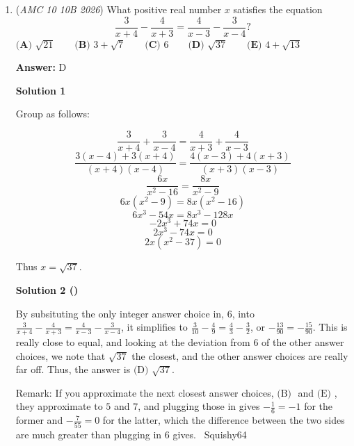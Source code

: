 \begin{enumerate}
 \textbf{Step 14: Steiner-formula consistency check.} For a box with side lengths $a,b,c$, the outer parallel body at distance $t$ has volume given by the Steiner polynomial
 \[abc+2(ab+bc+ca)\,t+\pi(a+b+c)\,t^2+\frac43\pi t^3.\]The $t^3$ term is contributed by the eight vertex regions, which assemble into one full ball. At $t=\frac12$ it equals $\frac43\pi\cdot\frac18=\frac\pi6$, agreeing with Step 13.

 \textbf{Step 15: Conclusion.} Combining Steps 1, 9, and 13,
 \[\lambda(U)=6-\frac{\pi}{6}\implies\boxed{\textbf{(C)}\ 6-\frac{\pi}{6}}.\]

 Remark: Who actually did this on the test? ~Squishy64

 


	\item (\textit{AMC 10 10B 2026}) What positive real number $x$ satisfies the equation 
 \[\frac{3}{x+4}-\frac{4}{x+3}=\frac{4}{x-3}-\frac{3}{x-4}?\]
$\textbf{(A) } \sqrt{21} \qquad \textbf{(B) } 3+\sqrt{7} \qquad \textbf{(C) } 6 \qquad \textbf{(D) } \sqrt{37} \qquad \textbf{(E) } 4+\sqrt{13}$

 \textbf{Answer: }D



\textbf{Solution 1}

Group as follows:

 
 \[\frac{3}{x+4} + \frac{3}{x-4} = \frac{4}{x+3} + \frac{4}{x-3}\]
 \[\frac{3(x-4) + 3(x+4)}{(x+4)(x-4)} = \frac{4(x-3) + 4(x+3)}{(x+3)(x-3)}\]
 \[\frac{6x}{x^2 - 16} = \frac{8x}{x^2 - 9}\]
 \[6x(x^2 - 9) = 8x(x^2 - 16)\]
 \[6x^3 - 54x = 8x^3 - 128x\]
 \[-2x^3+74x = 0\]
 \[2x^3 - 74x = 0\]
 \[2x(x^2 - 37) = 0\]

 Thus $x = \boxed{\sqrt{37}}$.

 



\textbf{Solution 2 ()}

By subsituting the only integer answer choice in, $6$, into $\frac{3}{x+4}-\frac{4}{x+3}=\frac{4}{x-3}-\frac{3}{x-4}$, it simplifies to $\frac{3}{10}-\frac{4}{9}=\frac{4}{3}-\frac{3}{2}$, or $-\frac{13}{90}=-\frac{15}{90}$. This is really close to equal, and looking at the deviation from 6 of the other answer choices, we note that $\sqrt{37}$ the closest, and the other answer choices are really far off. Thus, the answer is $\boxed{{\text{(D) }}\sqrt{37}}$.

 
Remark: If you approximate the next closest answer choices, $\text{(B) }$ and $\text{(E) }$, they approximate to $5$ and $7$, and plugging those in gives $-\frac{1}{6}=-1$ for the former and $-\frac{7}{55}=0$ for the latter, which the difference between the two sides are much greater than plugging in $6$ gives. ~Squishy64


\end{enumerate}
